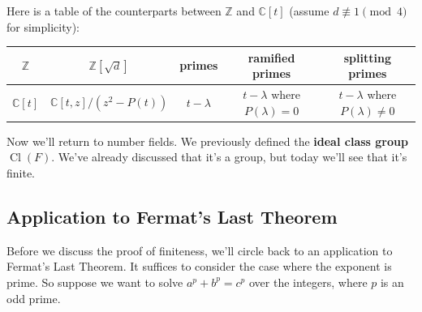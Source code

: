 
Here is a table of the counterparts between $\mathbb{Z}$ and $\mathbb{C}[t]$ (assume $d \not\equiv 1 \pmod{4}$ for simplicity):
\begin{center}
    \begin{tabular}{c|c|c|c|c}
        $\mathbb{Z}$ & $\mathbb{Z}[\sqrt{d}]$ & primes & ramified primes & splitting primes \\
        \hline
        $\mathbb{C}[t]$ & $\mathbb{C}[t, z]/(z^2 - P(t))$ & $t - \lambda$ & $t - \lambda$ where $P(\lambda) = 0$ & $t - \lambda$ where $P(\lambda) \neq 0$
    \end{tabular}
\end{center}


Now we'll return to number fields. We previously defined the \textbf{ideal class group} $\operatorname{Cl}(F)$. We've already discussed that it's a group, but today we'll see that it's finite. 



\subsection{Application to Fermat's Last Theorem}

Before we discuss the proof of finiteness, we'll circle back to an application to Fermat's Last Theorem. It suffices to consider the case where the exponent is prime. So suppose we want to solve $a^p + b^p = c^p$ over the integers, where $p$ is an odd prime. 

